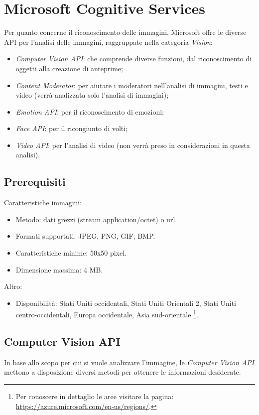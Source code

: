 
\section{Microsoft Cognitive Services}
Per quanto concerne il riconoscimento delle immagini, Microsoft offre le diverse API per l'analisi delle immagini, raggruppate nella categoria \textit{Vision}:
\begin{itemize}
\item \textit{Computer Vision API}: che comprende diverse funzioni, dal riconoscimento di oggetti alla creazione di anteprime;
\item \textit{Content Moderator}: per aiutare i moderatori nell'analisi di immagini, testi e video (verrà analizzata solo l'analisi di immagini);
\item \textit{Emotion API}: per il riconoscimento di emozioni;
\item \textit{Face API}: per il ricongiunto di volti;
\item \textit{Video API}: per l'analisi di video (non verrà preso in considerazioni in questa analisi).
\end{itemize}
%
\subsection{Prerequisiti}
Caratteristiche immagini:
\begin{itemize}
\item Metodo: dati grezzi (stream application/octet) o url.
\item Formati supportati: JPEG, PNG, GIF, BMP.
\item Caratteristiche minime: 50x50 pixel.
\item Dimensione massima: 4 MB.
\end{itemize}
Altro:
\begin{itemize}
\item Disponibilità: Stati Uniti occidentali, Stati Uniti Orientali 2, Stati Uniti centro-occidentali, Europa occidentale, Asia sud-orientale
\footnote{Per conoscere in dettaglio le aree visitare la pagina: \url{https://azure.microsoft.com/en-us/regions/}.}.
\end{itemize}
%
\subsection{Computer Vision API}\label{subsec:computer-vision-api}
In base allo scopo per cui si vuole analizzare l'immagine, le \textit{Computer Vision API} \cite{microsoft-api} mettono a disposizione diversi metodi per ottenere le informazioni desiderate.

